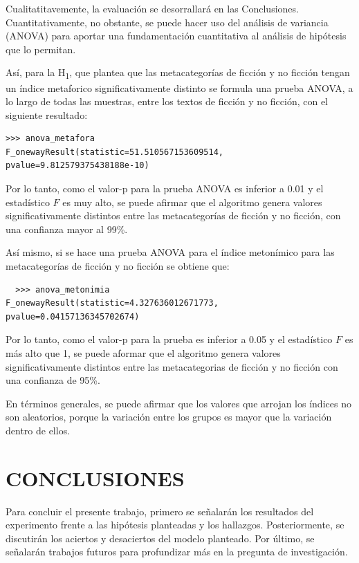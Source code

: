 \documentclass[12pt,letterpaper,twoside]{article}
\begin{document}
Cualitatitavemente, la evaluación se desorrallará en las
Conclusiones. Cuantitativamente, no obstante, se puede hacer uso
del análisis de variancia (ANOVA) para aportar una fundamentación
cuantitativa al análisis de hipótesis que lo permitan. 

Así, para la H\textsubscript{1}, que plantea que las metacategorías de ficción y
no ficción tengan un índice metaforico significativamente distinto
se formula una prueba ANOVA, a lo largo de todas las muestras,
entre los textos de ficción y no ficción, con el siguiente
resultado:

\begin{verbatim}
>>> anova_metafora
F_onewayResult(statistic=51.510567153609514, pvalue=9.812579375438188e-10)

\end{verbatim}

Por lo tanto, como el valor-p para la prueba ANOVA es inferior a
0.01 y el estadístico \(F\) es muy alto, se puede afirmar que el
algoritmo genera valores significativamente distintos entre las
metacategorías de ficción y no ficción, con una confianza mayor al
99\%.

Así mismo, si se hace una prueba ANOVA para el índice metonímico para las
metacategorías de ficción y no ficción se obtiene que:


\begin{verbatim}
  >>> anova_metonimia
F_onewayResult(statistic=4.327636012671773, pvalue=0.04157136345702674)

\end{verbatim}

Por lo tanto, como el valor-p para la prueba es inferior a 0.05 y el estadístico
\(F\) es más alto que 1, se puede aformar que el algoritmo genera valores
significativamente distintos entre las metacategorias de ficción y no ficción
con una confianza de 95\%.

En términos generales, se puede afirmar que los valores que arrojan
los índices no son aleatorios, porque la variación entre los grupos
es mayor que la variación dentro de ellos.

\section{CONCLUSIONES}
\label{sec:org224cd0e}

Para concluir el presente trabajo, primero se señalarán los resultados
del experimento frente a las hipótesis planteadas y los hallazgos.
Posteriormente, se discutirán los aciertos y desaciertos  del modelo
planteado. Por último, se señalarán trabajos futuros para profundizar
más en la pregunta de investigación.
\end{document}

